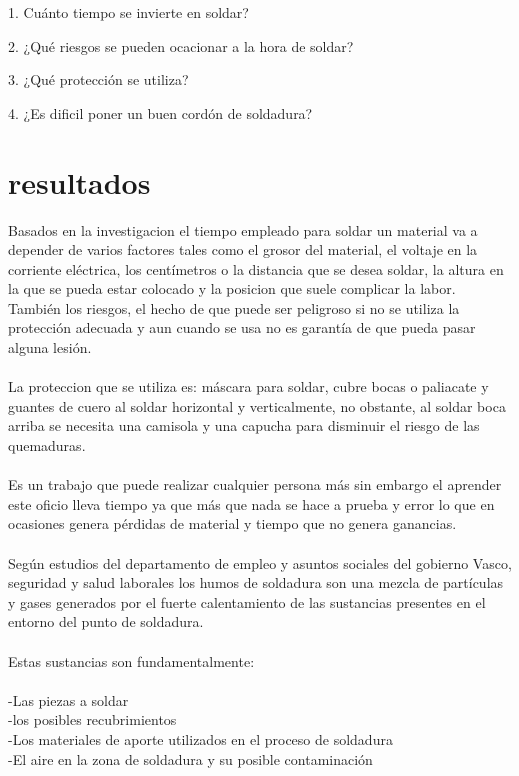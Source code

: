 \documentclass[12pt,letterpaper]{article}
\begin{document}
\begin{flushleft}
1. Cuánto tiempo se invierte en soldar?
\end{flushleft}
\begin{flushleft}
2.	¿Qué riesgos se pueden ocacionar a la hora de soldar?
\end{flushleft}
\begin{flushleft}
3.	¿Qué protección se utiliza?
\end{flushleft}
\begin{flushleft}
4.	¿Es dificil poner un buen cordón de soldadura?
\end{flushleft}

\newpage
\section*{resultados}

Basados en la investigacion el tiempo empleado para soldar un material va a depender de varios factores tales como el grosor del material, el voltaje en la corriente eléctrica, los centímetros o la distancia que se desea soldar, la altura en la que se pueda estar colocado y la posicion que suele complicar la labor. 
También los riesgos, el hecho de que puede ser peligroso si no se utiliza la protección adecuada y aun cuando se usa no es garantía de que pueda pasar alguna lesión.
\\\\
La proteccion que se utiliza es: máscara para soldar, cubre bocas o paliacate y guantes de cuero al soldar horizontal y verticalmente, no obstante, al soldar boca arriba se necesita una camisola y una capucha para disminuir el riesgo de las quemaduras.
\\\\
Es un trabajo que puede realizar cualquier persona más sin embargo el aprender este oficio lleva tiempo ya que más que nada se hace a prueba y error lo que en ocasiones genera pérdidas de material y tiempo que no genera ganancias.
\\\\
Según estudios del departamento de empleo y asuntos sociales del gobierno Vasco, seguridad y salud laborales los humos de soldadura son una mezcla de partículas y gases generados por el fuerte calentamiento de las sustancias presentes en el entorno del punto de soldadura.
\\\\
Estas sustancias son fundamentalmente:
\\\\
-Las piezas a soldar 
\\
-los posibles recubrimientos 
\\
-Los materiales de aporte utilizados en el proceso de soldadura 
\\
-El aire en la zona de soldadura y su posible contaminación
\end{document}
